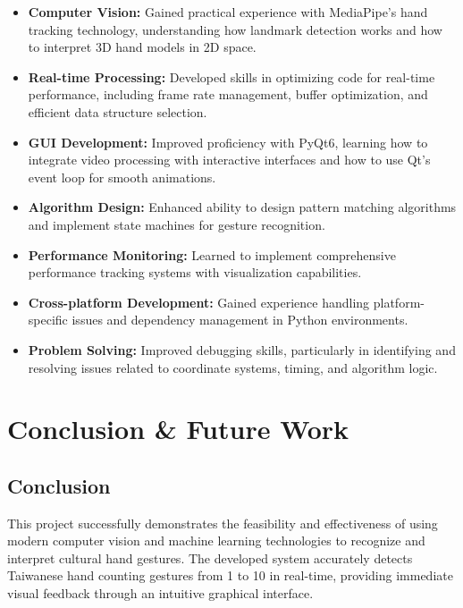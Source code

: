 \documentclass{article}
\begin{document}
\begin{itemize}
	
\item \textbf{Computer Vision:} Gained practical experience with MediaPipe's hand tracking technology, understanding how landmark detection works and how to interpret 3D hand models in 2D space.

\item \textbf{Real-time Processing:} Developed skills in optimizing code for real-time performance, including frame rate management, buffer optimization, and efficient data structure selection.

\item \textbf{GUI Development:} Improved proficiency with PyQt6, learning how to integrate video processing with interactive interfaces and how to use Qt's event loop for smooth animations.

\item \textbf{Algorithm Design:} Enhanced ability to design pattern matching algorithms and implement state machines for gesture recognition.

\item \textbf{Performance Monitoring:} Learned to implement comprehensive performance tracking systems with visualization capabilities.

\item \textbf{Cross-platform Development:} Gained experience handling platform-specific issues and dependency management in Python environments.

\item \textbf{Problem Solving:} Improved debugging skills, particularly in identifying and resolving issues related to coordinate systems, timing, and algorithm logic.

\end{itemize}

\section{Conclusion \& Future Work}

\subsection{Conclusion}

This project successfully demonstrates the feasibility and effectiveness of using modern computer vision and machine learning technologies to recognize and interpret cultural hand gestures. The developed system accurately detects Taiwanese hand counting gestures from 1 to 10 in real-time, providing immediate visual feedback through an intuitive graphical interface.
\end{document}
